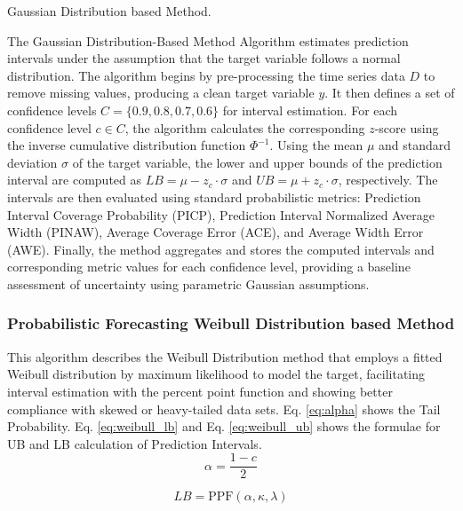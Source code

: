 \begin{itemize}
\begin{algorithm}[H]
        \caption{Gaussian Distribution based Method.}
        \end{algorithm}
        The Gaussian Distribution-Based Method Algorithm estimates prediction intervals under the assumption that the target variable follows a normal distribution. The algorithm begins by pre-processing the time series data $D$ to remove missing values, producing a clean target variable $y$. It then defines a set of confidence levels $C = \{0.9, 0.8, 0.7, 0.6\}$ for interval estimation. For each confidence level $c \in C$, the algorithm calculates the corresponding $z$-score using the inverse cumulative distribution function $\Phi^{-1}$. Using the mean $\mu$ and standard deviation $\sigma$ of the target variable, the lower and upper bounds of the prediction interval are computed as $LB = \mu - z_c \cdot \sigma$ and $UB = \mu + z_c \cdot \sigma$, respectively. The intervals are then evaluated using standard probabilistic metrics: Prediction Interval Coverage Probability (PICP), Prediction Interval Normalized Average Width (PINAW), Average Coverage Error (ACE), and Average Width Error (AWE). Finally, the method aggregates and stores the computed intervals and corresponding metric values for each confidence level, providing a baseline assessment of uncertainty using parametric Gaussian assumptions.



    \subsubsection{Probabilistic Forecasting Weibull Distribution based Method}
    This algorithm describes the Weibull Distribution method that employs a fitted Weibull distribution by maximum likelihood to model the target, facilitating interval estimation with the percent point function and showing better compliance with skewed or heavy-tailed data sets. Eq. \eqref{eq:alpha} shows the Tail Probability. Eq. \eqref{eq:weibull_lb} and Eq. \eqref{eq:weibull_ub} shows the formulae for UB and LB calculation of Prediction Intervals. \\

    \begin{equation}
        \alpha = \frac{1 - c}{2}
        \label{eq:alpha}
    \end{equation}

    \begin{equation}
        LB = \text{PPF}(\alpha, \kappa, \lambda)
        \label{eq:weibull_lb}
    \end{equation}
    

\end{itemize}
